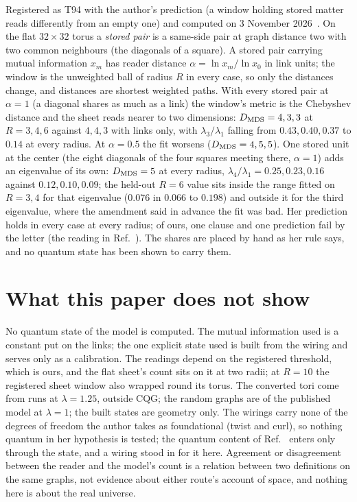 \documentclass[aps,pre,10pt,twocolumn,superscriptaddress,nofootinbib]{revtex4-2}
\begin{document}
Registered as T94 with the author's prediction (a window holding stored matter reads differently from an empty one)
and computed on 3 November 2026~\cite{prereg}. On the flat $32\times32$ torus a \emph{stored pair} is a same-side
pair at graph distance two with two common neighbours (the diagonals of a square). A stored pair carrying mutual
information $x_m$ has reader distance $\alpha=\ln x_m/\ln x_0$ in link units; the window is the unweighted ball of
radius $R$ in every case, so only the distances change, and distances are shortest weighted paths. With every stored
pair at $\alpha=1$ (a diagonal shares as much as a link) the window's metric is the Chebyshev distance and the sheet reads
nearer to two dimensions: $D_{\rm MDS}=4,3,3$ at $R=3,4,6$ against $4,4,3$ with links only, with $\lambda_3/\lambda_1$
falling from $0.43,0.40,0.37$ to $0.14$ at every radius. At $\alpha=0.5$ the fit worsens ($D_{\rm MDS}=4,5,5$). One
stored unit at the center (the eight diagonals of the four squares meeting there, $\alpha=1$) adds an eigenvalue of its
own: $D_{\rm MDS}=5$ at every radius, $\lambda_4/\lambda_1=0.25,0.23,0.16$ against $0.12,0.10,0.09$; the held-out
$R=6$ value sits inside the range fitted on $R=3,4$ for that eigenvalue ($0.076$ in $0.066$ to $0.198$) and outside it
for the third eigenvalue, where the amendment said in advance the fit was bad. Her prediction holds in every case at
every radius; of ours, one clause and one prediction fail by the letter (the reading in Ref.~\cite{prereg}). The
shares are placed by hand as her rule says, and no quantum state has been shown to carry them.

\section{What this paper does not show}

No quantum state of the model is computed. The mutual information used is a constant put on the links; the one
explicit state used is built from the wiring and serves only as a calibration. The readings depend on the registered
threshold, which is ours, and the flat sheet's count sits on it at two radii; at $R=10$ the registered sheet window
also wrapped round its torus. The converted tori come from runs at
$\lambda=1.25$, outside CQG; the random graphs are of the published model at $\lambda=1$; the built states are
geometry only. The wirings carry none of the degrees of freedom the author takes as foundational (twist and curl), so
nothing quantum in her hypothesis is tested; the quantum content of Ref.~\cite{CCM16} enters only through the state,
and a wiring stood in for it here. Agreement or disagreement between the reader and the model's count is a relation between two
definitions on the same graphs, not evidence about either route's account of space, and nothing here is about the
real universe.
\end{document}
